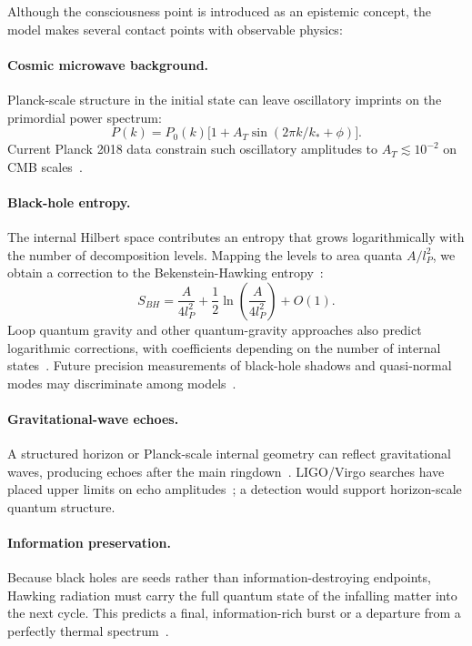 \documentclass[11pt,a4paper]{article}
\theoremstyle{plain}
\begin{document}
Although the consciousness point is introduced as an epistemic concept, the model makes several contact points with observable physics:

\paragraph{Cosmic microwave background.} Planck-scale structure in the initial state can leave oscillatory imprints on the primordial power spectrum:
\begin{equation}\label{eq:cmb}
P(k)=P_0(k)\bigl[1+A_T\sin(2\pi k/k_*+\phi)\bigr].
\end{equation}
Current Planck 2018 data constrain such oscillatory amplitudes to $A_T\lesssim 10^{-2}$ on CMB scales~\cite{planck2018}.

\paragraph{Black-hole entropy.} The internal Hilbert space contributes an entropy that grows logarithmically with the number of decomposition levels. Mapping the levels to area quanta $A/l_P^2$, we obtain a correction to the Bekenstein-Hawking entropy~\cite{bekenstein1973,hawking1974}:
\begin{equation}\label{eq:entropy}
S_{BH}=\frac{A}{4l_P^2}+\frac{1}{2}\ln\!\left(\frac{A}{4l_P^2}\right)+O(1).
\end{equation}
Loop quantum gravity and other quantum-gravity approaches also predict logarithmic corrections, with coefficients depending on the number of internal states~\cite{rovelli2008,kiefer2012}. Future precision measurements of black-hole shadows and quasi-normal modes may discriminate among models~\cite{eht2019}.

\paragraph{Gravitational-wave echoes.} A structured horizon or Planck-scale internal geometry can reflect gravitational waves, producing echoes after the main ringdown~\cite{ligo2016}. LIGO/Virgo searches have placed upper limits on echo amplitudes~\cite{ligo2024tests}; a detection would support horizon-scale quantum structure.

\paragraph{Information preservation.} Because black holes are seeds rather than information-destroying endpoints, Hawking radiation must carry the full quantum state of the infalling matter into the next cycle. This predicts a final, information-rich burst or a departure from a perfectly thermal spectrum~\cite{hawking1974}.
\end{document}

